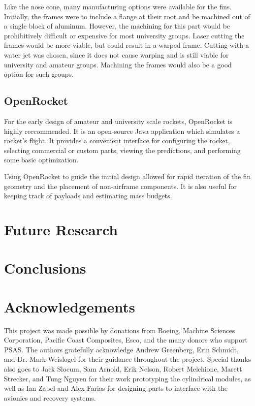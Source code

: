 \documentclass{aiaa-tc}%
\begin{document}
Like the nose cone, many manufacturing options were available for the fins. 
Initially, the frames were to include a flange at their root and be machined out of a single block of aluminum. 
However, the machining for this part would be prohibitively difficult or expensive for most university groups. 
Laser cutting the frames would be more viable, but could result in a warped frame.
Cutting with a water jet was chosen, since it does not cause warping and is still viable for university and amateur groups. 
Machining the frames would also be a good option for such groups. 

\subsection{OpenRocket}
For the early design of amateur and university scale rockets, OpenRocket\cite{OR} is highly reccommended. 
It is an open-source Java application which simulates a rocket's flight. It provides a convenient interface for configuring the rocket, selecting commercial or custom parts, viewing the predictions, and performing some basic optimization. 

Using OpenRocket to guide the initial design allowed for rapid iteration of the fin geometry and the placement of non-airframe components. 
It is also useful for keeping track of payloads and estimating mass budgets.

\section{Future Research}

\section{Conclusions}

\section{Acknowledgements}

This project was made possible by donations from Boeing, Machine Sciences Corporation, Pacific Coast Composites, Esco, and the many donors who support PSAS.
The authors gratefully acknowledge Andrew Greenberg, Erin Schmidt, and Dr. Mark Weislogel for their guidance throughout the project.
Special thanks also goes to Jack Slocum, Sam Arnold, Erik Nelson, Robert Melchione, Marett Strecker, and Tung Nguyen for their work prototyping the cylindrical modules, as well as Ian Zabel and Alex Farias for designing parts to interface with the avionics and recovery systems.

\end{document}
